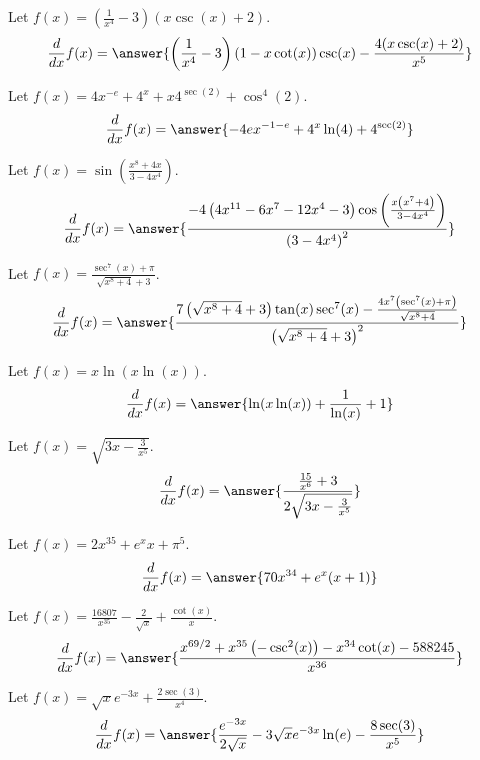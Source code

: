 \documentclass{ximera}
\begin{document}
\begin{shuffle}
\begin{exercise}
Let $f(x)=\left(\frac{1}{x^4}-3\right) (x \csc (x)+2)$.
\[
\ddx f(x) = \answer{\left(\frac{1}{x^4}-3\right) (1-x \cot (x)) \csc (x)-\frac{4 (x \csc (x)+2)}{x^5}}
\]
\end{exercise}

\begin{exercise}
Let $f(x)=4 x^{-e}+4^x+x 4^{\sec (2)}+\cos ^4(2)$.
\[
\ddx f(x) = \answer{-4 e x^{-1-e}+4^x \ln (4)+4^{\sec (2)}}
\]
\end{exercise}

\begin{exercise}
Let $f(x)=\sin \left(\frac{x^8+4 x}{3-4 x^4}\right)$.
\[
\ddx f(x) = \answer{\frac{-4 \left(4 x^{11}-6 x^7-12 x^4-3\right) \cos \left(\frac{x \left(x^7+4\right)}{3-4 x^4}\right)}{\left(3-4 x^4\right)^2}}
\]
\end{exercise}

\begin{exercise}
Let $f(x)=\frac{\sec ^7(x)+\pi }{\sqrt{x^8+4}+3}$.
\[
\ddx f(x) = \answer{\frac{7 \left(\sqrt{x^8+4}+3\right) \tan (x) \sec ^7(x)-\frac{4 x^7 \left(\sec ^7(x)+\pi \right)}{\sqrt{x^8+4}}}{\left(\sqrt{x^8+4}+3\right)^2}}
\]
\end{exercise}

\begin{exercise}
Let $f(x)=x \ln (x \ln (x))$.
\[
\ddx f(x) = \answer{\ln (x \ln (x))+\frac{1}{\ln (x)}+1}
\]
\end{exercise}

\begin{exercise}
Let $f(x)=\sqrt{3 x-\frac{3}{x^5}}$.
\[
\ddx f(x) = \answer{\frac{\frac{15}{x^6}+3}{2 \sqrt{3 x-\frac{3}{x^5}}}}
\]
\end{exercise}

\begin{exercise}
Let $f(x)=2 x^{35}+e^x x+\pi ^5$.
\[
\ddx f(x) = \answer{70 x^{34}+e^x (x+1)}
\]
\end{exercise}

\begin{exercise}
Let $f(x)=\frac{16807}{x^{35}}-\frac{2}{\sqrt{x}}+\frac{\cot (x)}{x}$.
\[
\ddx f(x) = \answer{\frac{x^{69/2}+x^{35} \left(-\csc ^2(x)\right)-x^{34} \cot (x)-588245}{x^{36}}}
\]
\end{exercise}

\begin{exercise}
Let $f(x)=\sqrt{x} e^{-3 x}+\frac{2 \sec (3)}{x^4}$.
\[
\ddx f(x) = \answer{\frac{e^{-3 x}}{2 \sqrt{x}}-3 \sqrt{x} e^{-3 x} \ln (e)-\frac{8 \sec (3)}{x^5}}
\]
\end{exercise}


\end{shuffle}
\end{document}
